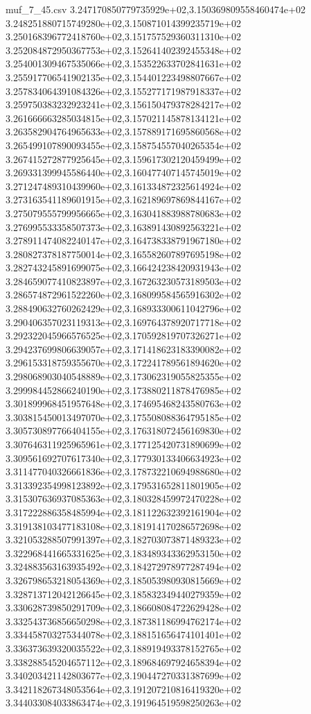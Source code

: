 \begin{filecontents*}{muf_7_45.csv}
3.247170850779735929e+02,3.150369809558460474e+02
3.248251880715749280e+02,3.150871014399235719e+02
3.250168396772418760e+02,3.151757529360311310e+02
3.252084872950367753e+02,3.152641402392455348e+02
3.254001309467535066e+02,3.153522633702841631e+02
3.255917706541902135e+02,3.154401223498807667e+02
3.257834064391084326e+02,3.155277171987918337e+02
3.259750383232923241e+02,3.156150479378284217e+02
3.261666663285034815e+02,3.157021145878134121e+02
3.263582904764965633e+02,3.157889171695860568e+02
3.265499107890093455e+02,3.158754557040265354e+02
3.267415272877925645e+02,3.159617302120459499e+02
3.269331399945586440e+02,3.160477407145745019e+02
3.271247489310439960e+02,3.161334872325614924e+02
3.273163541189601915e+02,3.162189697869844167e+02
3.275079555799956665e+02,3.163041883988780683e+02
3.276995533358507373e+02,3.163891430892563221e+02
3.278911474082240147e+02,3.164738338791967180e+02
3.280827378187750014e+02,3.165582607897695198e+02
3.282743245891699075e+02,3.166424238420931943e+02
3.284659077410823897e+02,3.167263230573189503e+02
3.286574872961522260e+02,3.168099584565916302e+02
3.288490632760262429e+02,3.168933300611042796e+02
3.290406357023119313e+02,3.169764378920717718e+02
3.292322045966576525e+02,3.170592819707326271e+02
3.294237699806639057e+02,3.171418623183390082e+02
3.296153318759355670e+02,3.172241789561894620e+02
3.298068903040548889e+02,3.173062319055825355e+02
3.299984452866240190e+02,3.173880211878476985e+02
3.301899968451957648e+02,3.174695468243580763e+02
3.303815450013497070e+02,3.175508088364795185e+02
3.305730897766404155e+02,3.176318072456169830e+02
3.307646311925965961e+02,3.177125420731890699e+02
3.309561692707617340e+02,3.177930133406634923e+02
3.311477040326661836e+02,3.178732210694988680e+02
3.313392354998123892e+02,3.179531652811801905e+02
3.315307636937085363e+02,3.180328459972470228e+02
3.317222886358485994e+02,3.181122632392161904e+02
3.319138103477183108e+02,3.181914170286572698e+02
3.321053288507991397e+02,3.182703073871489323e+02
3.322968441665331625e+02,3.183489343362953150e+02
3.324883563163935492e+02,3.184272978977287494e+02
3.326798653218054369e+02,3.185053980930815669e+02
3.328713712042126645e+02,3.185832349440279359e+02
3.330628739850291709e+02,3.186608084722629428e+02
3.332543736856650298e+02,3.187381186994762174e+02
3.334458703275344078e+02,3.188151656474101401e+02
3.336373639320035522e+02,3.188919493378152765e+02
3.338288545204657112e+02,3.189684697924658394e+02
3.340203421142803677e+02,3.190447270331387699e+02
3.342118267348053564e+02,3.191207210816419320e+02
3.344033084033863474e+02,3.191964519598250263e+02

\end{filecontents*}
